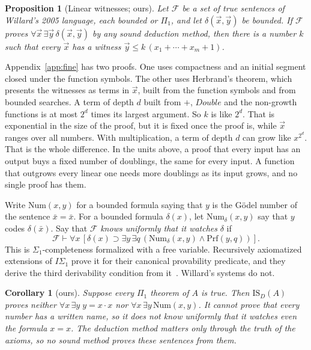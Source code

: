 \documentclass[11pt]{article}
\newcommand{\F}{\mathcal{F}}
\newcommand{\Prf}{\mathrm{Prf}}
\newcommand{\ISD}{\mathrm{IS}_D(A)}
\theoremstyle{plain}
\newtheorem{proposition}[theorem]{Proposition}
\newtheorem{corollary}[theorem]{Corollary}
\theoremstyle{definition}
\begin{document}
\begin{proposition}[Linear witnesses; ours]\label{prop:herbrand}
Let $\F$ be a set of true sentences of Willard's 2005 language, each bounded
or $\Pi_1$, and let $\delta(\vec x, \vec y)$ be bounded. If $\F$ proves
$\forall\vec x\,\exists\vec y\,\delta(\vec x, \vec y)$ by any sound
deduction method, then there is a number $k$ such that every $\vec x$ has a
witness $\vec y \le k\,(x_1 + \cdots + x_m + 1)$.
\end{proposition}

\noindent
Appendix~\ref{app:fine} has two proofs. One uses compactness and an initial
segment closed under the function symbols. The other uses Herbrand's
theorem, which presents the witnesses as terms in $\vec x$, built from the
function symbols and from bounded searches. A term of depth $d$ built from
$+$, $\mathit{Double}$ and the non-growth functions is at most $2^d$ times
its largest argument. So $k$ is like $2^d$. That is exponential in the
size of the proof, but it is fixed once the proof is, while $\vec x$ ranges
over all numbers. With multiplication, a term of depth $d$ can grow like
$x^{2^d}$. That is the whole difference. In the units above, a proof that
every input has an output buys a fixed number of doublings, the same for
every input. A function that outgrows every linear one needs more doublings
as its input grows, and no single proof has them.

Write $\mathrm{Num}(x,y)$ for a bounded formula saying that $y$ is the Gödel
number of the sentence $\bar x = \bar x$. For a bounded formula $\delta(x)$,
let $\mathrm{Num}_\delta(x,y)$ say that $y$ codes $\delta(\bar x)$. Say that
$\F$ \emph{knows uniformly that it watches} $\delta$ if
\[
\F \vdash \forall x\,[\delta(x) \supset \exists y\,\exists
q\,(\mathrm{Num}_\delta(x,y) \wedge \Prf(y,q))].
\]
This is $\Sigma_1$-completeness formalized with a free variable. Recursively
axiomatized extensions of $I\Sigma_1$ prove it for their canonical
provability predicate, and they derive the third derivability condition from
it~\cite{hp93}. Willard's systems do not.

\begin{corollary}[ours]\label{cor:uniform}
Suppose every $\Pi_1$ theorem of $A$ is true. Then $\ISD$ proves neither
$\forall x\,\exists y\; y = x \cdot x$ nor
$\forall x\,\exists y\,\mathrm{Num}(x,y)$. It cannot prove that every number
has a written name, so it does not know uniformly that it watches even the
formula $x = x$. The deduction method matters only through the truth of the
axioms, so no sound method proves these sentences from them.
\end{corollary}
\end{document}
